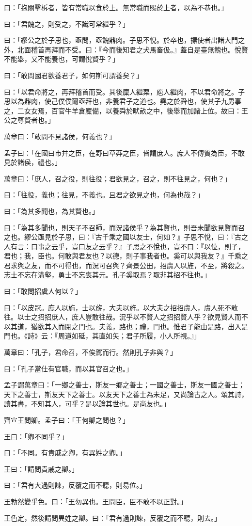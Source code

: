 \begin{pinyinscope}
曰：「抱關擊柝者，皆有常職以食於上。無常職而賜於上者，以為不恭也。」

曰：「君餽之，則受之，不識可常繼乎？」

曰：「繆公之於子思也，亟問，亟餽鼎肉。子思不悅。於卒也，摽使者出諸大門之外，北面稽首再拜而不受。曰：『今而後知君之犬馬畜伋。』蓋自是臺無餽也。悅賢不能舉，又不能養也，可謂悅賢乎？」

曰：「敢問國君欲養君子，如何斯可謂養矣？」

曰：「以君命將之，再拜稽首而受。其後廩人繼粟，庖人繼肉，不以君命將之。子思以為鼎肉，使己僕僕爾亟拜也，非養君子之道也。堯之於舜也，使其子九男事之，二女女焉，百官牛羊倉廩備，以養舜於畎畝之中，後舉而加諸上位。故曰：王公之尊賢者也。」

萬章曰：「敢問不見諸侯，何義也？」

孟子曰：「在國曰市井之臣，在野曰草莽之臣，皆謂庶人。庶人不傳質為臣，不敢見於諸侯，禮也。」

萬章曰：「庶人，召之役，則往役；君欲見之，召之，則不往見之，何也？」

曰：「往役，義也；往見，不義也。且君之欲見之也，何為也哉？」

曰：「為其多聞也，為其賢也。」

曰：「為其多聞也，則天子不召師，而況諸侯乎？為其賢也，則吾未聞欲見賢而召之也。繆公亟見於子思，曰：『古千乘之國以友士，何如？』子思不悅，曰：『古之人有言：曰事之云乎，豈曰友之云乎？』子思之不悅也，豈不曰：『以位，則子，君也；我，臣也。何敢與君友也？以德，則子事我者也。奚可以與我友？』千乘之君求與之友，而不可得也，而況可召與？齊景公田，招虞人以旌，不至，將殺之。志士不忘在溝壑，勇士不忘喪其元。孔子奚取焉？取非其招不往也。」

曰：「敢問招虞人何以？」

曰：「以皮冠。庶人以旃，士以旂，大夫以旌。以大夫之招招虞人，虞人死不敢往。以士之招招庶人，庶人豈敢往哉。況乎以不賢人之招招賢人乎？欲見賢人而不以其道，猶欲其入而閉之門也。夫義，路也；禮，門也。惟君子能由是路，出入是門也。《詩》云：『周道如砥，其直如矢；君子所履，小人所視。』」

萬章曰：「孔子，君命召，不俟駕而行。然則孔子非與？」

曰：「孔子當仕有官職，而以其官召之也。」

孟子謂萬章曰：「一鄉之善士，斯友一鄉之善士；一國之善士，斯友一國之善士；天下之善士，斯友天下之善士。以友天下之善士為未足，又尚論古之人。頌其詩，讀其書，不知其人，可乎？是以論其世也。是尚友也。」

齊宣王問卿。孟子曰：「王何卿之問也？」

王曰：「卿不同乎？」

曰：「不同。有貴戚之卿，有異姓之卿。」

王曰：「請問貴戚之卿。」

曰：「君有大過則諫，反覆之而不聽，則易位。」

王勃然變乎色。曰：「王勿異也。王問臣，臣不敢不以正對。」

王色定，然後請問異姓之卿。曰：「君有過則諫，反覆之而不聽，則去。」


\end{pinyinscope}